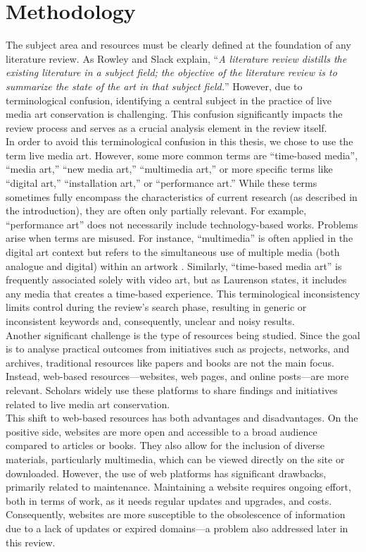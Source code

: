 \section{Methodology}
The subject area and resources must be clearly defined at the foundation of any literature review. As Rowley and Slack \cite{rowley2004conducting} explain, ``\textit{A literature review distills the existing literature in a subject field; the objective of the literature review is to summarize the state of the art in that subject field.}” However, due to terminological confusion, identifying a central subject in the practice of live media art conservation is challenging. This confusion significantly impacts the review process and serves as a crucial analysis element in the review itself.\\
In order to avoid this terminological confusion in this thesis, we chose to use the term live media art. However, some more common terms are ``time-based media'', ``media art,'' ``new media art,'' ``multimedia art,'' or more specific terms like ``digital art,'' ``installation art,'' or ``performance art.'' While these terms sometimes fully encompass the characteristics of current research (as described in the introduction), they are often only partially relevant. For example, ``performance art'' does not necessarily include technology-based works. Problems arise when terms are misused. For instance, ``multimedia'' is often applied in the digital art context but refers to the simultaneous use of multiple media (both analogue and digital) within an artwork \cite{friedman2023intermedia}. Similarly, ``time-based media art'' is frequently associated solely with video art, but as Laurenson \cite{laurenson2001developing} states, it includes any media that creates a time-based experience. This terminological inconsistency limits control during the review’s search phase, resulting in generic or inconsistent keywords and, consequently, unclear and noisy results.\\
Another significant challenge is the type of resources being studied. Since the goal is to analyse practical outcomes from initiatives such as projects, networks, and archives, traditional resources like papers and books are not the main focus. Instead, web-based resources—websites, web pages, and online posts—are more relevant. Scholars widely use these platforms to share findings and initiatives related to live media art conservation.\\
This shift to web-based resources has both advantages and disadvantages. On the positive side, websites are more open and accessible to a broad audience compared to articles or books. They also allow for the inclusion of diverse materials, particularly multimedia, which can be viewed directly on the site or downloaded. However, the use of web platforms has significant drawbacks, primarily related to maintenance. Maintaining a website requires ongoing effort, both in terms of work, as it needs regular updates and upgrades, and costs. Consequently, websites are more susceptible to the obsolescence of information due to a lack of updates or expired domains—a problem also addressed later in this review.

